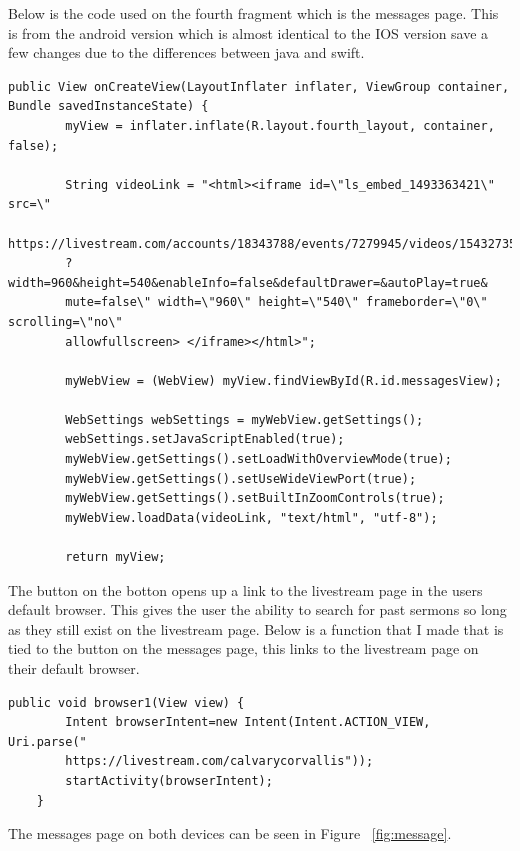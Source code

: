 \documentclass[letterpaper,10pt,draftclsnofoot,onecolumn,titlepage]{IEEEtran}
\begin{document}
		Below is the code used on the fourth fragment which is the messages page.
		This is from the android version which is almost identical to the IOS version save a few changes due to the differences between java and swift.
		\begin{lstlisting}
public View onCreateView(LayoutInflater inflater, ViewGroup container, 
Bundle savedInstanceState) {
        myView = inflater.inflate(R.layout.fourth_layout, container, false);

        String videoLink = "<html><iframe id=\"ls_embed_1493363421\" src=\"
        https://livestream.com/accounts/18343788/events/7279945/videos/154327352/player
        ?width=960&height=540&enableInfo=false&defaultDrawer=&autoPlay=true&
        mute=false\" width=\"960\" height=\"540\" frameborder=\"0\" scrolling=\"no\" 
        allowfullscreen> </iframe></html>";

        myWebView = (WebView) myView.findViewById(R.id.messagesView);

        WebSettings webSettings = myWebView.getSettings();
        webSettings.setJavaScriptEnabled(true);
        myWebView.getSettings().setLoadWithOverviewMode(true);
        myWebView.getSettings().setUseWideViewPort(true);
        myWebView.getSettings().setBuiltInZoomControls(true);
        myWebView.loadData(videoLink, "text/html", "utf-8");

        return myView;
		\end{lstlisting}
		The button on the botton opens up a link to the livestream page in the users default browser.
		This gives the user the ability to search for past sermons so long as they still exist on the livestream page.
		Below is a function that I made that is tied to the button on the messages page, this links to the livestream page on their default browser.
		\begin{lstlisting}
public void browser1(View view) {
        Intent browserIntent=new Intent(Intent.ACTION_VIEW, Uri.parse("
        https://livestream.com/calvarycorvallis"));
        startActivity(browserIntent);
    }

		\end{lstlisting}

	

		The messages page on both devices can be seen in Figure ~\ref{fig:message}.
\end{document}
